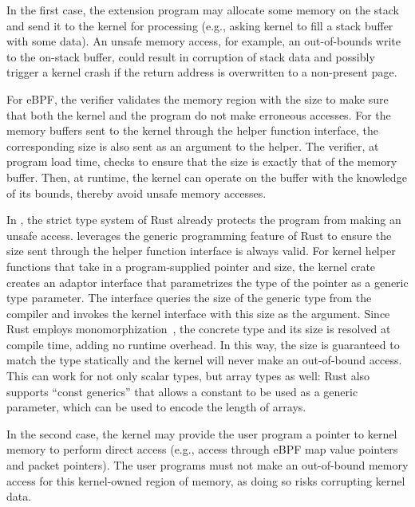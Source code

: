 In the first case, the extension program may allocate some memory on the stack
    and send it to the kernel for processing (e.g., asking kernel to fill a
    stack buffer with some data).
An unsafe memory access, for example, an out-of-bounds write to the on-stack
    buffer, could result in corruption of stack data and possibly trigger a
    kernel crash if the return address is overwritten to a non-present page.

For eBPF, the verifier validates the memory region with the size to make sure
    that both the kernel and the program do not make erroneous accesses.
For the memory buffers sent to the kernel through the helper function interface,
    the corresponding size is also sent as an argument to the helper.
The verifier, at program load time, checks to ensure that the size is exactly
    that of the memory buffer.
Then, at runtime, the kernel can operate on the buffer with the knowledge of
    its bounds, thereby avoid unsafe memory accesses.

In \projname{}, the strict type system of Rust already protects the program
    from making an unsafe access.
\projname{} leverages the generic programming feature of Rust to ensure the
    size sent through the helper function interface is always valid.
For kernel helper functions that take in a
    program-supplied pointer and size, the \projname{} kernel crate creates an
    adaptor interface that parametrizes the type of the pointer as a generic
    type parameter.
The interface queries the size of the generic type from the compiler
    and invokes the kernel interface with this size as the argument.
Since Rust employs monomorphization~\cite{rustc-monomorphize}, the concrete
    type and its size is resolved at compile time, adding no runtime overhead.
In this way, the size is guaranteed to match the type statically and the
    kernel will never make an out-of-bound access.
This can work for not only scalar types, but array types as well: Rust
    also supports ``const generics'' that allows a constant to be used as a
    generic parameter, which can be used to encode the length of arrays.

In the second case, the kernel may provide the user program a pointer to
    kernel memory to perform direct access (e.g., access through eBPF map value
    pointers and packet pointers).
The user programs must not make an out-of-bound memory access for this
    kernel-owned region of memory, as doing so risks corrupting kernel data.

